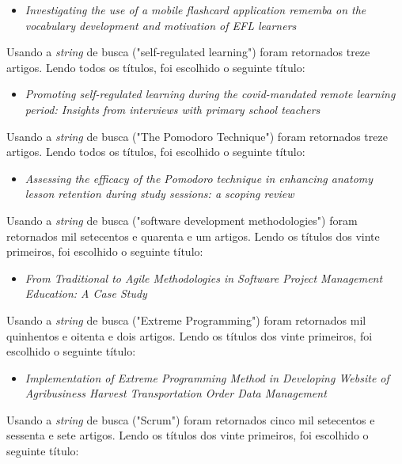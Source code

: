 \begin{itemize}
    \item \textit{Investigating the use of a mobile flashcard application rememba on the vocabulary development and motivation of EFL learners}
\end{itemize}

Usando a \textit{string} de busca ("self-regulated learning") foram retornados treze artigos.
Lendo todos os títulos, foi escolhido o seguinte título:

\begin{itemize}
    \item \textit{Promoting self-regulated learning during the covid-mandated remote learning period: Insights from interviews with primary school teachers}
\end{itemize}

Usando a \textit{string} de busca ("The Pomodoro Technique") foram retornados treze artigos.
Lendo todos os títulos, foi escolhido o seguinte título:

\begin{itemize}
    \item \textit{Assessing the efficacy of the Pomodoro technique in enhancing anatomy lesson retention during study sessions: a scoping review}
\end{itemize}

Usando a \textit{string} de busca ("software development methodologies") foram retornados mil setecentos e quarenta e um artigos.
Lendo os títulos dos vinte primeiros, foi escolhido o seguinte título:

\begin{itemize}
    \item \textit{From Traditional to Agile Methodologies in Software Project Management Education: A Case Study}
\end{itemize}

Usando a \textit{string} de busca ("Extreme Programming") foram retornados mil quinhentos e oitenta e dois artigos.
Lendo os títulos dos vinte primeiros, foi escolhido o seguinte título:

\begin{itemize}
    \item \textit{Implementation of Extreme Programming Method in Developing Website of Agribusiness Harvest Transportation Order Data Management}
\end{itemize}

Usando a \textit{string} de busca ("Scrum") foram retornados cinco mil setecentos e sessenta e sete artigos.
Lendo os títulos dos vinte primeiros, foi escolhido o seguinte título:

